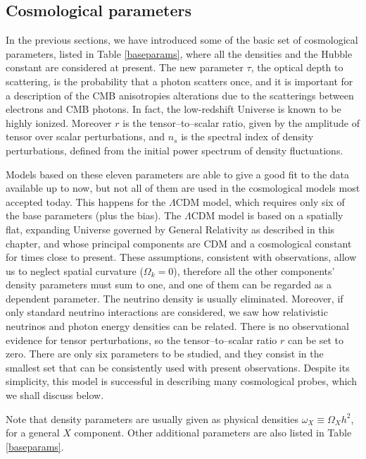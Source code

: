 \subsection{Cosmological parameters}
In the previous sections, we have introduced some of the basic set of cosmological parameters, listed in Table \ref{baseparams}, where all the densities and the Hubble constant are considered at present. The new parameter $\tau$, the optical depth to scattering, is the probability that a photon scatters once, and it is important for a description of the CMB anisotropies alterations due to the scatterings between electrons and CMB photons. In fact, the low-redshift Universe is known to be highly ionized. Moreover $r$ is the tensor--to--scalar ratio, given by the amplitude of tensor over scalar perturbations, and $n_s$ is the spectral index of density perturbations, defined from the initial power spectrum of density fluctuations.

Models based on these eleven parameters are able to give a good fit to the data available up to now, but not all of them are used in the cosmological models most accepted today. This happens for the $\Lambda$CDM model, which requires only six of the base parameters (plus the bias). The $\Lambda$CDM model is based on a spatially flat, expanding Universe governed by General Relativity as described in this chapter, and whose principal components are CDM and a cosmological constant for times close to present. These assumptions, consistent with observations, allow us to neglect spatial curvature ($\Omega_k=0$), therefore all the other components' density parameters must sum to one, and one of them can be regarded as a dependent parameter. The neutrino density is usually eliminated. Moreover, if only standard neutrino interactions are considered, we saw how relativistic neutrinos and photon energy densities can be related. There is no observational evidence for tensor perturbations, so the tensor--to--scalar ratio $r$ can be set to zero. There are only six parameters to be studied, and they consist in the smallest set that can be consistently used with present observations. Despite its simplicity, this model is successful in describing many cosmological probes, which we shall discuss below.

Note that density parameters are usually given as physical densities $\omega_X\equiv \Omega_Xh^2$, for a general $X$ component. Other additional parameters are also listed in Table \ref{baseparams}.

